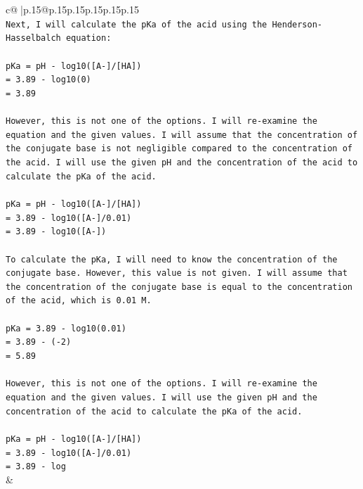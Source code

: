 \documentclass{article}
\begin{document}
{\begin{supertabular}{c@{$\;$}|p{.15\linewidth}@{}p{.15\linewidth}p{.15\linewidth}p{.15\linewidth}p{.15\linewidth}p{.15\linewidth}}
{{{\\ 
\texttt{Next, I will calculate the pKa of the acid using the Henderson{-}Hasselbalch equation:} \\
\\ 
\texttt{pKa = pH {-} log10({[}A{-}{]}/{[}HA{]})} \\
\texttt{= 3.89 {-} log10(0)} \\
\texttt{= 3.89} \\
\\ 
\texttt{However, this is not one of the options. I will re{-}examine the equation and the given values. I will assume that the concentration of the conjugate base is not negligible compared to the concentration of the acid. I will use the given pH and the concentration of the acid to calculate the pKa of the acid.} \\
\\ 
\texttt{pKa = pH {-} log10({[}A{-}{]}/{[}HA{]})} \\
\texttt{= 3.89 {-} log10({[}A{-}{]}/0.01)} \\
\texttt{= 3.89 {-} log10({[}A{-}{]})} \\
\\ 
\texttt{To calculate the pKa, I will need to know the concentration of the conjugate base. However, this value is not given. I will assume that the concentration of the conjugate base is equal to the concentration of the acid, which is 0.01 M.} \\
\\ 
\texttt{pKa = 3.89 {-} log10(0.01)} \\
\texttt{= 3.89 {-} ({-}2)} \\
\texttt{= 5.89} \\
\\ 
\texttt{However, this is not one of the options. I will re{-}examine the equation and the given values. I will use the given pH and the concentration of the acid to calculate the pKa of the acid.} \\
\\ 
\texttt{pKa = pH {-} log10({[}A{-}{]}/{[}HA{]})} \\
\texttt{= 3.89 {-} log10({[}A{-}{]}/0.01)} \\
\texttt{= 3.89 {-} log} \\
            }
        }
    }
    & \\ \\

\end{supertabular}
}
\end{document}
